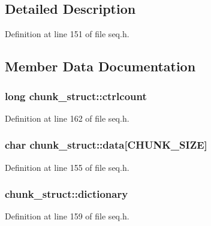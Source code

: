 \subsection{Detailed Description}


Definition at line 151 of file seq.\+h.



\subsection{Member Data Documentation}
\subsubsection[{\texorpdfstring{ctrlcount}{ctrlcount}}]{\setlength{\rightskip}{0pt plus 5cm}long chunk\+\_\+struct\+::ctrlcount}\hypertarget{structchunk__struct_a0f00a7b0d9ebb763434e97b755df1275}{}\label{structchunk__struct_a0f00a7b0d9ebb763434e97b755df1275}


Definition at line 162 of file seq.\+h.

\subsubsection[{\texorpdfstring{data}{data}}]{\setlength{\rightskip}{0pt plus 5cm}char chunk\+\_\+struct\+::data\mbox{[}{\bf C\+H\+U\+N\+K\+\_\+\+S\+I\+ZE}\mbox{]}}\hypertarget{structchunk__struct_afd1e82a4b95631fc0bf56c308d017314}{}\label{structchunk__struct_afd1e82a4b95631fc0bf56c308d017314}


Definition at line 155 of file seq.\+h.

\subsubsection[{\texorpdfstring{dictionary}{dictionary}}]{ chunk\+\_\+struct\+::dictionary}\hypertarget{structchunk__struct_a39028f92d8e102ad269319a1fb6dc17c}{}\label{structchunk__struct_a39028f92d8e102ad269319a1fb6dc17c}


Definition at line 159 of file seq.\+h.

